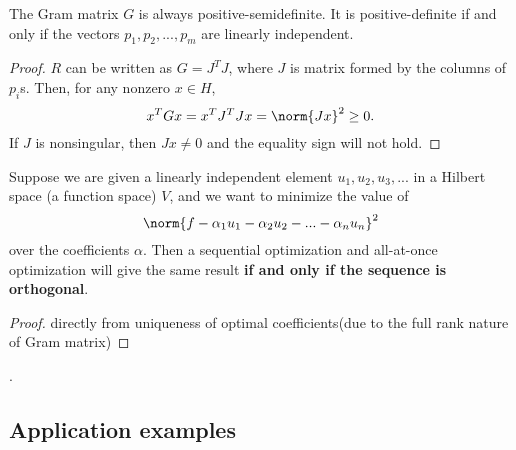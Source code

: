 \begin{refsection}
\begin{theorem}
The Gram matrix $G$ is always positive-semidefinite. It is positive-definite if and only if the vectors $p_1,p_2,...,p_m$ are linearly independent. 
\end{theorem}
\begin{proof}
$R$ can be written as $G = J^T J$, where $J$ is matrix formed by the columns of $p_i$s. Then, for any nonzero $x \in H$, 
$$x^TGx = x^TJ^TJx = \norm{Jx}^2 \geq 0.$$
If $J$ is nonsingular, then $Jx \neq 0$ and the equality sign will not hold. 
\end{proof}



\begin{theorem}\label{ch:functional-analysis:th:conditionoffinality}
	\cite[54]{davis1989fourier}
	Suppose we are given a linearly independent element $u_1,u_2,u_3,...$ in a Hilbert space (a function space) $V$, and we want to minimize the value of $$\norm{f-\alpha_1 u_1 - \alpha_2 u_2 -...- \alpha_n u_n}^2$$ over the coefficients $\alpha$. Then a sequential optimization and all-at-once optimization will give the same result \textbf{if and only if the sequence is orthogonal}. 
\end{theorem}
\begin{proof}
directly from uniqueness of optimal coefficients(due to the full rank nature of Gram matrix)	
\end{proof}
.

\subsection{Application examples}

\end{refsection}
